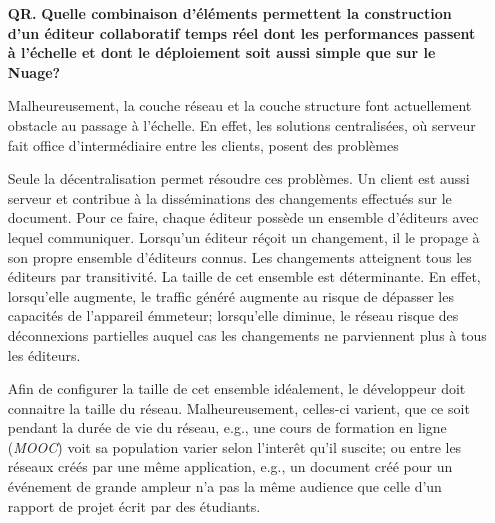 \begin{itemize}
\item [\textbf{QR.}] \textbf{Quelle combinaison d'éléments permettent la
    construction d'un éditeur collaboratif temps réel dont les performances
    passent à l'échelle et dont le déploiement soit aussi simple que sur le
    Nuage?}
  
  Malheureusement, la couche réseau et la couche structure font actuellement
  obstacle au passage à l'échelle. En effet, les solutions centralisées, où
  serveur fait office d'intermédiaire entre les clients, posent des problèmes
  Seule la décentralisation permet résoudre ces problèmes. Un client est aussi
  serveur et contribue à la disséminations des changements effectués sur le
  document. Pour ce faire, chaque éditeur possède un ensemble d'éditeurs avec
  lequel communiquer. Lorsqu'un éditeur réçoit un changement, il le propage à
  son propre ensemble d'éditeurs connus. Les changements atteignent tous les
  éditeurs par transitivité. La taille de cet ensemble est déterminante. En
  effet, lorsqu'elle augmente, le traffic généré augmente au risque de dépasser
  les capacités de l'appareil émmeteur; lorsqu'elle diminue, le réseau risque
  des déconnexions partielles auquel cas les changements ne parviennent plus à
  tous les éditeurs.

  Afin de configurer la taille de cet ensemble idéalement, le développeur doit
  connaitre la taille du réseau. Malheureusement, celles-ci varient, que ce soit
  pendant la durée de vie du réseau, e.g., une cours de formation en ligne
  (\emph{MOOC}) voit sa population varier selon l'interêt qu'il suscite; ou
  entre les réseaux créés par une même application, e.g., un document créé pour
  un événement de grande ampleur n'a pas la même audience que celle d'un rapport
  de projet écrit par des étudiants.



\end{itemize}
